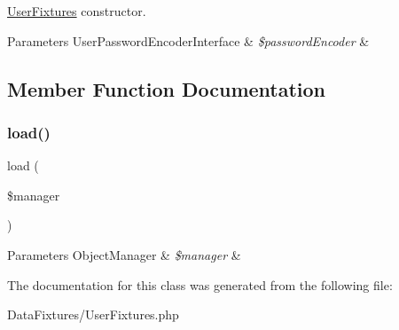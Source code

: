 \mbox{\hyperlink{class_app_1_1_data_fixtures_1_1_user_fixtures}{User\+Fixtures}} constructor. 
\begin{DoxyParams}[1]{Parameters}
User\+Password\+Encoder\+Interface & {\em \$password\+Encoder} & \\
\hline
\end{DoxyParams}


\subsection{Member Function Documentation}
\mbox{\label{class_app_1_1_data_fixtures_1_1_user_fixtures_acb7929747e63056fbc9e2892615c18b2}} 
\subsubsection{\texorpdfstring{load()}{load()}}
{\footnotesize\ttfamily load (\begin{DoxyParamCaption}\item[{Object\+Manager}]{\$manager }\end{DoxyParamCaption})}


\begin{DoxyParams}[1]{Parameters}
Object\+Manager & {\em \$manager} & \\
\hline
\end{DoxyParams}


The documentation for this class was generated from the following file\+:\begin{DoxyCompactItemize}
\item 
Data\+Fixtures/User\+Fixtures.\+php\end{DoxyCompactItemize}
